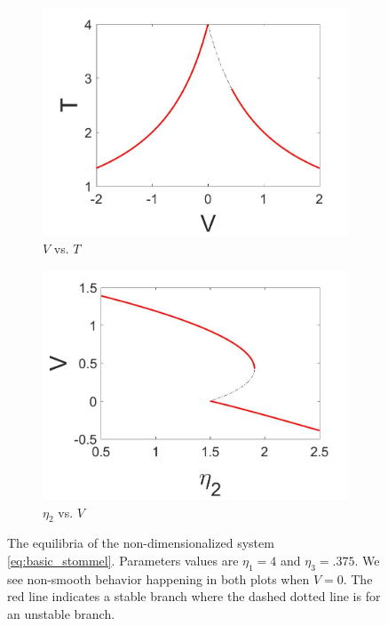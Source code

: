 \begin{figure}[H]
\centering
\begin{subfigure}{.5\textwidth}
 \centering
 \includegraphics[width=\linewidth]{intro/T_equil.jpg}
 \caption{$V$ vs. $T$}
 \label{fig:Tequil}
\end{subfigure}%
\begin{subfigure}{.5\textwidth}
 \centering
 \includegraphics[width=\linewidth]{intro/V_bif.jpg}
 \caption{$\eta_2$ vs. $V$}
 \label{fig:Vbif}
\end{subfigure}
\caption{The equilibria of the non-dimensionalized system \eqref{eq:basic_stommel}. Parameters values are $\eta_1=4$ and $\eta_3=.375$. We see non-smooth behavior happening in both plots when $V=0$. The red line indicates a stable branch where the dashed dotted line is for an unstable branch.}
\label{fig:systemequil}
\end{figure}

